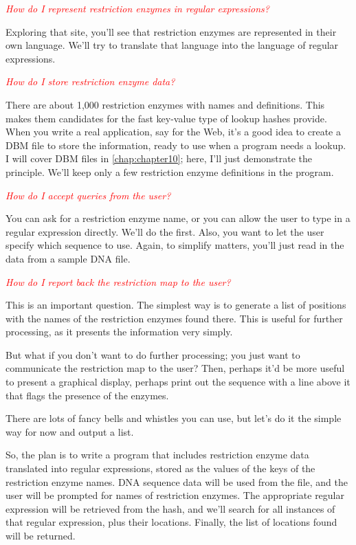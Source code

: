 \textcolor{red}{\textit{How do I represent restriction enzymes in regular expressions?}}
\begin{adjustwidth}{1cm}{}
Exploring that site, you'll see that restriction enzymes are represented in their own language. We'll try to translate that language into the language of regular expressions.
\end{adjustwidth}

\textcolor{red}{\textit{How do I store restriction enzyme data?}}
\begin{adjustwidth}{1cm}{}
There are about 1,000 restriction enzymes with names and definitions. This makes them candidates for the fast key-value type of lookup hashes provide. When you write a real application, say for the Web, it's a good idea to create a DBM file to store the information, ready to use when a program needs a lookup. I will cover DBM files in \autoref{chap:chapter10}; here, I'll just demonstrate the principle. We'll keep only a few restriction enzyme definitions in the program.
\end{adjustwidth}

\textcolor{red}{\textit{How do I accept queries from the user?}}
\begin{adjustwidth}{1cm}{}
You can ask for a restriction enzyme name, or you can allow the user to type in a regular expression directly. We'll do the first. Also, you want to let the user specify which sequence to use. Again, to simplify matters, you'll just read in the data from a sample DNA file. 
\end{adjustwidth}

\textcolor{red}{\textit{How do I report back the restriction map to the user?}}
\begin{adjustwidth}{1cm}{}
This is an important question. The simplest way is to generate a list of positions with the names of the restriction enzymes found there. This is useful for further processing, as it presents the information very simply.

But what if you don't want to do further processing; you just want to communicate the restriction map to the user? Then, perhaps it'd be more useful to present a graphical display, perhaps print out the sequence with a line above it that flags the presence of the enzymes.

There are lots of fancy bells and whistles you can use, but let's do it the simple way for now and output a list.
\end{adjustwidth}

So, the plan is to write a program that includes restriction enzyme data translated into regular expressions, stored as the values of the keys of the restriction enzyme names. DNA sequence data will be used from the file, and the user will be prompted for names of restriction enzymes. The appropriate regular expression will be retrieved from the hash, and we'll search for all instances of that regular expression, plus their locations. Finally, the list of locations found will be returned. 

